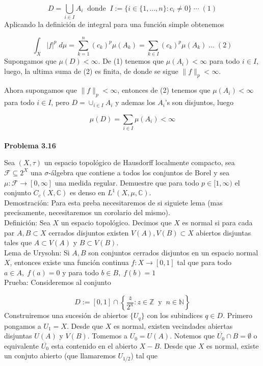 \documentclass[12pt]{article}
\begin{document}
    \[D = \bigcup_{i\in I} A_i\;\; \text{donde}\;\; I := \{i\in\{1,\ldots,n\} : c_i \neq 0\}\; \cdots\; (1)\]
    Aplicando la definici\'on de integral para una funci\'on simple obtenemos

    \[\int_X |f|^p\;d\mu = \sum_{k=1}^n(c_k)^p\mu(A_k) = \sum_{k\in I}(c_k)^p\mu(A_k)\; \ldots\; (2)\]
    Supongamos que $\mu(D) < \infty$. De (1) tenemos que $\mu(A_i) < \infty$ para todo 
    $i\in I$, luego, la ultima suma de (2) es finita, de donde se sigue $\|f\|_p < \infty$. 

    Ahora supongamos que $\|f\|_p < \infty$, entonces de (2) tenemos que $\mu(A_i) < \infty$
    para todo $i\in I$, pero $D = \cup_{i\in I} A_i$ y ademas los $A_i$'s son disjuntos,
    luego

    \[\mu(D) = \sum_{i\in I} \mu(A_i) < \infty\]
    \\

    \textbf{Problema 3.16}

    Sea $(X,\tau)$ un espacio topol\'ogico de Hausdorff localmente compacto, sea 
    $\mathcal{F}\subseteq 2^X$ una $\sigma$-\'algebra que contiene a todos los conjuntos 
    de Borel y sea $\mu:\mathcal{F}\rightarrow [0,\infty]$ una medida regular. Demuestre 
    que para todo $p\in [1,\infty)$ el conjunto $C_c(X,\mathbb{C})$ es denso en 
    $L^1(X,\mu,\mathbb{C})$.
    \\

    Demostraci\'on: Para esta preba necesitaremos de si siguiete lema (mas precisamente, 
    necesitaremos un corolario del mismo). 
    \\

    Definici\'on: Sea $X$ un espacio topol\'ogico. Decimos que $X$ es normal
    si para cada par $A,B\subset X$ cerrados disjuntos existen $V(A),V(B)\subset X$
    abiertos disjuntas tales que $A\subset V(A)$ y $B\subset V(B)$.
    \\

    Lema de Urysohn: Si $A,B$ son conjuntos cerrados disjuntos en un espacio normal $X$,
    entonces existe una funci\'on continua $f:X\rightarrow [0,1]$ tal que para todo 
    $a\in A,\; f(a) = 0$ y para todo $b\in B,\; f(b) = 1$
    \\

    Prueba: Consideremos al conjunto

    \[D := [0,1]\cap\left\{\frac{z}{2^n} : z\in\mathbb{Z}\;\; \text{y}\;\; n\in \mathbb{N}\right\}\]
    Construiremos una sucesi\'on de abiertos $\{U_q\}$ con los subindices $q\in D$. Primero
    pongamos a $U_1 = X$. Desde que $X$ es normal, existen vecindades abiertas disjuntas 
    $U(A)$ y $V(B)$. Tomemos a $U_0 = U(A)$. Notemos que $\overline{U_0}\cap B = \emptyset$
    o equivalente $\overline{U_0}$ esta contenido en el abierto $X-B$. Desde que $X$ es 
    normal, existe un conjuto abierto (que llamaremos $U_{1/2}$) tal que 
\end{document}
